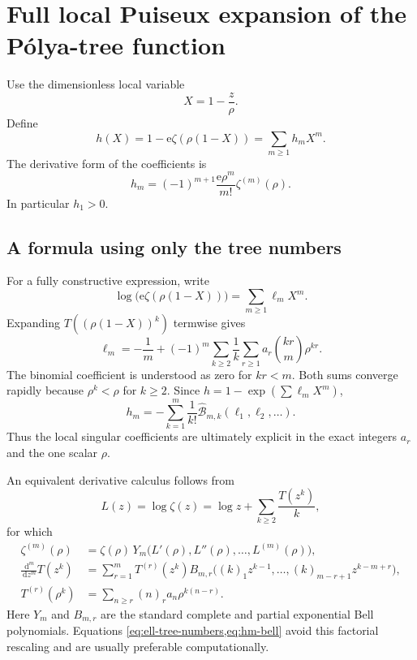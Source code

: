 \documentclass[11pt]{article}
\theoremstyle{definition}
\theoremstyle{remark}
\newcommand{\Bell}{\widehat{\mathcal B}}
\newcommand{\e}{\mathrm e}
\newcommand{\dd}{\,\mathrm d}
\newcommand{\fall}[2]{(#1)_{#2}}
\begin{document}
\section{Full local Puiseux expansion of the P\'olya-tree function}
\label{sec:local-puiseux}

Use the dimensionless local variable
\begin{equation}
 X=1-\frac z\rho.
 \label{eq:X}
\end{equation}
Define
\begin{equation}
 h(X)=1-\e\zeta(\rho(1-X))=\sum_{m\geq1}h_mX^m.
 \label{eq:hX}
\end{equation}
The derivative form of the coefficients is
\begin{equation}
 h_m=(-1)^{m+1}\frac{\e\rho^m}{m!}\zeta^{(m)}(\rho).
 \label{eq:hm-derivative}
\end{equation}
In particular $h_1>0$.

\subsection{A formula using only the tree numbers}

For a fully constructive expression, write
\begin{equation}
 \log\!\bigl(\e\zeta(\rho(1-X))\bigr)
 =\sum_{m\geq1}\ell_mX^m.
 \label{eq:ell-def}
\end{equation}
Expanding $T((\rho(1-X))^k)$ termwise gives
\begin{equation}
 \boxed{
 \ell_m=-\frac1m+(-1)^m
 \sum_{k\geq2}\frac1k
 \sum_{r\geq1}a_r\binom{kr}{m}\rho^{kr}.}
 \label{eq:ell-tree-numbers}
\end{equation}
The binomial coefficient is understood as zero for $kr<m$.  Both sums
converge rapidly because $\rho^k<\rho$ for $k\geq2$.  Since
$h=1-\exp(\sum\ell_mX^m)$,
\begin{equation}
 \boxed{
 h_m=-\sum_{k=1}^m\frac1{k!}
 \Bell_{m,k}(\ell_1,\ell_2,\ldots).}
 \label{eq:hm-bell}
\end{equation}
Thus the local singular coefficients are ultimately explicit in the exact
integers $a_r$ and the one scalar $\rho$.

An equivalent derivative calculus follows from
\[
 L(z)=\log\zeta(z)=\log z+\sum_{k\geq2}\frac{T(z^k)}{k},
\]
for which
\begin{align}
 \zeta^{(m)}(\rho)
 &=\zeta(\rho)\,Y_m\bigl(L'(\rho),L''(\rho),\ldots,L^{(m)}(\rho)\bigr),
 \label{eq:zeta-complete-bell}\\
 \frac{\dd^m}{\dd z^m}T(z^k)
 &=\sum_{r=1}^m T^{(r)}(z^k)
 B_{m,r}\bigl(\fall{k}{1}z^{k-1},\ldots,
               \fall{k}{m-r+1}z^{k-m+r}\bigr),
 \label{eq:faa-chain}\\
 T^{(r)}(\rho^k)
 &=\sum_{n\geq r}\fall{n}{r}a_n\rho^{k(n-r)}.
 \label{eq:T-derivatives}
\end{align}
Here $Y_m$ and $B_{m,r}$ are the standard complete and partial exponential
Bell polynomials.  Equations \cref{eq:ell-tree-numbers,eq:hm-bell} avoid this
factorial rescaling and are usually preferable computationally.
\end{document}

